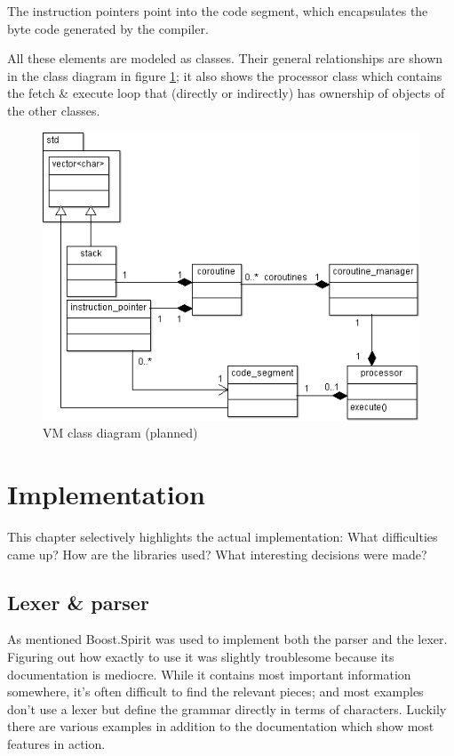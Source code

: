 			The instruction pointers point into the code segment, which encapsulates the byte code generated by the compiler.
			
			All these elements are modeled as classes. Their general relationships are shown in the class diagram in figure \ref{fig:vm_class_diagram}; it also shows the processor class which contains the fetch \& execute loop that (directly or indirectly) has ownership of objects of the other classes.
			
			\begin{figure}
			\centering
			\includegraphics[width=\textwidth]{figures/vm_classes_cropped}
			\caption{VM class diagram (planned)}
			\label{fig:vm_class_diagram}
			\end{figure}

\chapter{Implementation}

	This chapter selectively highlights the actual implementation: What difficulties came up? How are the libraries used? What interesting decisions were made?
	
	\section{Lexer \& parser}
		
		As mentioned Boost.Spirit was used to implement both the parser and the lexer. Figuring out how exactly to use it was slightly troublesome because its documentation is mediocre. While it contains most important information somewhere, it's often difficult to find the relevant pieces; and most examples don't use a lexer but define the grammar directly in terms of characters. Luckily there are various examples in addition to the documentation which show most features in action.
		
